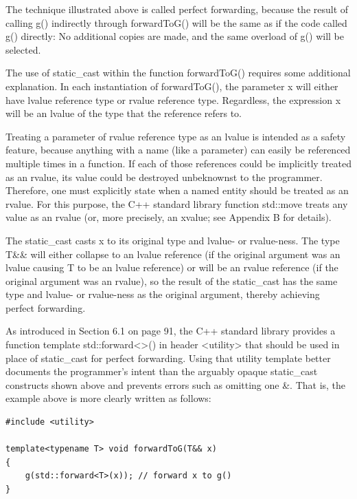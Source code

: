 The technique illustrated above is called perfect forwarding, because the result of calling g() indirectly through forwardToG() will be the same as if the code called g() directly: No additional copies are made, and the same overload of g() will be selected.

The use of static\_cast within the function forwardToG() requires some additional explanation. In each instantiation of forwardToG(), the parameter x will either have lvalue reference type or rvalue reference type. Regardless, the expression x will be an lvalue of the type that the reference refers to.

\begin{tcolorbox}[colback=webgreen!5!white,colframe=webgreen!75!black]
\hspace*{0.75cm}Treating a parameter of rvalue reference type as an lvalue is intended as a safety feature, because anything with a name (like a parameter) can easily be referenced multiple times in a function. If each of those references could be implicitly treated as an rvalue, its value could be destroyed unbeknownst to the programmer. Therefore, one must explicitly state when a named entity should be treated as an rvalue. For this purpose, the C++ standard library function std::move treats any value as an rvalue (or, more precisely, an xvalue; see Appendix B for details).
\end{tcolorbox}

The static\_cast casts x to its original type and lvalue- or rvalue-ness. The type T\&\& will either collapse to an lvalue reference (if the original argument was an lvalue causing T to be an lvalue reference) or will be an rvalue reference (if the original argument was an rvalue), so the result of the static\_cast has the same type and lvalue- or rvalue-ness as the original argument, thereby achieving perfect forwarding.

As introduced in Section 6.1 on page 91, the C++ standard library provides a function template std::forward<>() in header <utility> that should be used in place of static\_cast for perfect forwarding. Using that utility template better documents the programmer’s intent than the arguably opaque static\_cast constructs shown above and prevents errors such as omitting one \&. That is, the example above is more clearly written as follows:


\begin{lstlisting}[style=styleCXX]
#include <utility>

template<typename T> void forwardToG(T&& x)
{
	g(std::forward<T>(x)); // forward x to g()
}
\end{lstlisting}

